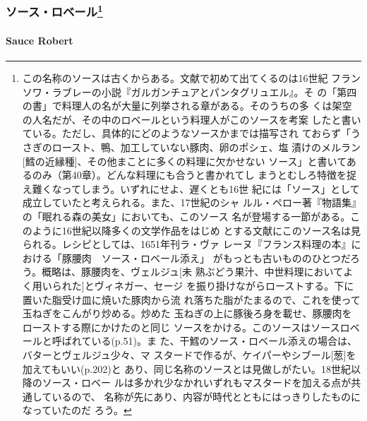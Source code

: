 \begin{recette}
{\subsubsection[ソース・ロベール]{\texorpdfstring{ソース・ロベール\footnote{この名称のソースは古くからある。文献で初めて出てくるのは16世紀
  フランソワ・ラブレーの小説『ガルガンチュアとパンタグリュエル』。そ
  の「第四の書」で料理人の名が大量に列挙される章がある。そのうちの多
  くは架空の人名だが、その中のロベールという料理人がこのソースを考案
  したと書いている。ただし、具体的にどのようなソースかまでは描写され
  ておらず「うさぎのロースト、鴨、加工していない豚肉、卵のポシェ、塩
  漬けのメルラン{[}鱈の近縁種{]}、その他まことに多くの料理に欠かせない
  ソース」と書いてあるのみ（第40章）。どんな料理にも合うと書かれてし
  まうとむしろ特徴を捉え難くなってしまう。いずれにせよ、遅くとも16世
  紀には「ソース」として成立していたと考えられる。また、17世紀のシャ
  ルル・ペロー著『物語集』の「眠れる森の美女」においても、このソース
  名が登場する一節がある。このように16世紀以降多くの文学作品をはじめ
  とする文献にこのソース名は見られる。レシピとしては、1651年刊ラ・ヴァ
  レーヌ『フランス料理の本』における「豚腰肉　ソース・ロベール添え」
  がもっとも古いもののひとつだろう。概略は、豚腰肉を、ヴェルジュ{[}未
  熟ぶどう果汁、中世料理においてよく用いられた{]}とヴィネガー、セージ
  を振り掛けながらローストする。下に置いた脂受け皿に焼いた豚肉から流
  れ落ちた脂がたまるので、これを使って玉ねぎをこんがり炒める。炒めた
  玉ねぎの上に豚後ろ身を載せ、豚腰肉をローストする際にかけたのと同じ
  ソースをかける。このソースはソースロベールと呼ばれている(p.51)。ま
  た、干鱈のソース・ロベール添えの場合は、バターとヴェルジュ少々、マ
  スタードで作るが、ケイパーやシブール{[}葱{]}を加えてもいい(p.202)と
  あり、同じ名称のソースとは見做しがたい。18世紀以降のソース・ロベー
  ルは多かれ少なかれいずれもマスタードを加える点が共通しているので、
  名称が先にあり、内容が時代とともにはっきりしたものになっていたのだ
  ろう。}}{ソース・ロベール}}\label{ux30bdux30fcux30b9ux30edux30d9ux30fcux30eb77}}

\hypertarget{sauce-robert}{%
\paragraph{Sauce Robert}\label{sauce-robert}}



\end{recette}
